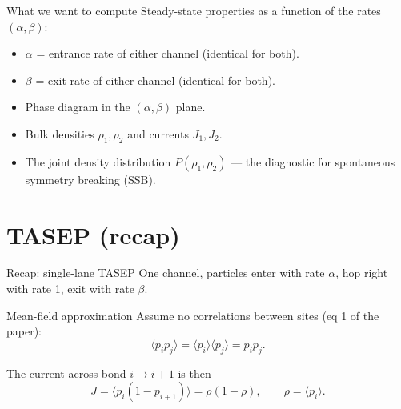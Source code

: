 \documentclass[aspectratio=169,10pt]{beamer}
\begin{document}
\begin{frame}{What we want to compute}
  Steady-state properties as a function of the rates $(\alpha, \beta)$:
  \begin{itemize}
    \item $\alpha$ = entrance rate of either channel (identical for both).
    \item $\beta$ = exit rate of either channel (identical for both).
    \item Phase diagram in the $(\alpha, \beta)$ plane.
    \item Bulk densities $\rho_1, \rho_2$ and currents $J_1, J_2$.
    \item The joint density distribution $P(\rho_1, \rho_2)$ --- the diagnostic
      for spontaneous symmetry breaking (SSB).
  \end{itemize}
\end{frame}

\section{TASEP (recap)}
\begin{frame}{Recap: single-lane TASEP}
  One channel, particles enter with rate $\alpha$, hop right with rate 1,
  exit with rate $\beta$.
  \vspace{0.3em}
  \begin{block}{Mean-field approximation}
    Assume no correlations between sites (eq 1 of the paper):
    \[
      \langle p_i p_j \rangle = \langle p_i \rangle\langle p_j \rangle
      = p_i p_j .
    \]
  \end{block}
  The current across bond $i \to i{+}1$ is then
  \[
    J = \langle p_i (1 - p_{i+1})\rangle = \rho(1-\rho), \qquad \rho = \langle p_i\rangle .
  \]
\end{frame}
\end{document}
